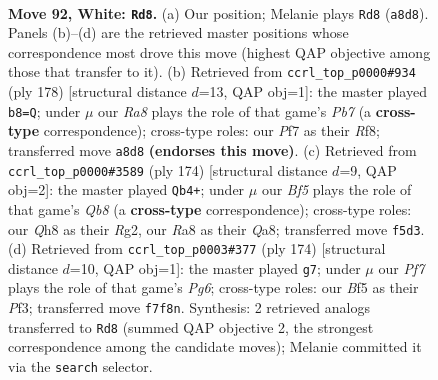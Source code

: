 \documentclass[11pt]{article}
\begin{document}
\clearpage

\begin{figure}[p]\centering
\begin{subfigure}{0.46\textwidth}\centering
\resizebox{\linewidth}{!}{%
\newchessgame
\chessboard[
  setfen={R6Q/5P2/8/5B2/8/4k3/8/7K w - - 1 92},
  showmover=false,
  pgfstyle=straightmove, color=movearrow, markmove={a8-d8}
]}
\caption{}
\end{subfigure}\hfill
\begin{subfigure}{0.46\textwidth}\centering
\resizebox{\linewidth}{!}{%
\newchessgame
\chessboard[
  setfen={5R2/1P6/4Q3/k1B5/2K5/8/8/8 w - - 1 90},
  showmover=false,
  pgfstyle=straightmove, color=movearrow, markmove={b7-b8}
]}
\caption{}
\end{subfigure}
\\[4pt]
\begin{subfigure}{0.46\textwidth}\centering
\resizebox{\linewidth}{!}{%
\newchessgame
\chessboard[
  setfen={QQ6/8/8/2k5/8/8/2K3R1/8 w - - 1 88},
  showmover=false,
  pgfstyle=straightmove, color=movearrow, markmove={b8-b4}
]}
\caption{}
\end{subfigure}\hfill
\begin{subfigure}{0.46\textwidth}\centering
\resizebox{\linewidth}{!}{%
\newchessgame
\chessboard[
  setfen={R6Q/8/6P1/8/8/3k1P2/6K1/8 w - - 1 88},
  showmover=false,
  pgfstyle=straightmove, color=movearrow, markmove={g6-g7}
]}
\caption{}
\end{subfigure}
\caption{\textbf{Move 92, White: \texttt{Rd8}.} (a) Our position; Melanie plays \texttt{Rd8} (\texttt{a8d8}). Panels (b)--(d) are the retrieved master positions whose correspondence most drove this move (highest QAP objective among those that transfer to it). (b) Retrieved from \texttt{ccrl\_top\_p0000\#934} (ply 178) [structural distance $d$=13, QAP obj=1]: the master played \texttt{b8=Q}; under $\mu$ our \emph{Ra8} plays the role of that game's \emph{Pb7} (a \textbf{cross-type} correspondence); cross-type roles: our \emph{P}f7 as their \emph{R}f8; transferred move \texttt{a8d8} \textbf{(endorses this move)}. (c) Retrieved from \texttt{ccrl\_top\_p0000\#3589} (ply 174) [structural distance $d$=9, QAP obj=2]: the master played \texttt{Qb4+}; under $\mu$ our \emph{Bf5} plays the role of that game's \emph{Qb8} (a \textbf{cross-type} correspondence); cross-type roles: our \emph{Q}h8 as their \emph{R}g2, our \emph{R}a8 as their \emph{Q}a8; transferred move \texttt{f5d3}. (d) Retrieved from \texttt{ccrl\_top\_p0003\#377} (ply 174) [structural distance $d$=10, QAP obj=1]: the master played \texttt{g7}; under $\mu$ our \emph{Pf7} plays the role of that game's \emph{Pg6}; cross-type roles: our \emph{B}f5 as their \emph{P}f3; transferred move \texttt{f7f8n}. Synthesis: 2 retrieved analogs transferred to \texttt{Rd8} (summed QAP objective 2, the strongest correspondence among the candidate moves); Melanie committed it via the \texttt{search} selector.}
\label{fig:thought-m182}
\end{figure}
\end{document}
